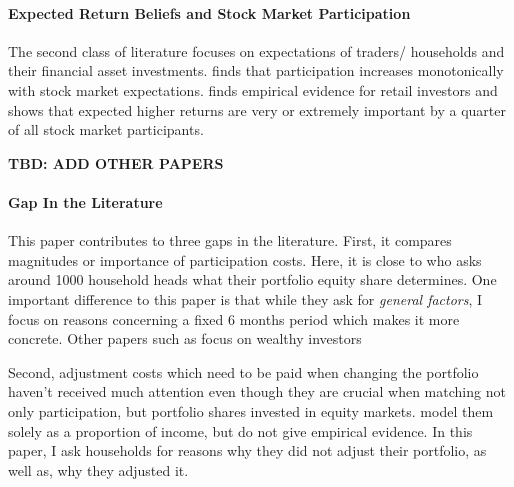 \documentclass[ProjectABM]{subfiles}
\begin{document}

\paragraph{Expected Return Beliefs and Stock Market Participation}
The second class of literature focuses on expectations of traders/ households and their financial asset investments. \cite{arrondel_et_al_2014subjective_return_expectation} finds that participation increases monotonically with stock market expectations. \cite{giglio_et_al_2019five} finds empirical evidence for retail investors and \cite{choi_2020} shows that expected higher returns are very or extremely important by a quarter of all stock market participants.

\textbf{TBD: ADD OTHER PAPERS}

\paragraph{Gap In the Literature}
This paper contributes to three gaps in the literature. First, it compares magnitudes or importance of participation costs. Here, it is close to \cite{choi_2020} who asks around 1000 household heads what their portfolio equity share determines. One important difference to this paper is that while they ask for \textit{general factors}, I focus on reasons concerning a fixed 6 months period which makes it more concrete. Other papers such as \cite{bender_et_al_2019} focus on wealthy investors

Second, adjustment costs which need to be paid when changing the portfolio haven't received much attention even though they are crucial when matching not only participation, but portfolio shares invested in equity markets. \cite{bonaparte_et_al_2012adjustment} model them solely as a proportion of income, but do not give empirical evidence. In this paper, I ask households for reasons why they did not adjust their portfolio, as well as, why they adjusted it.
\end{document}
